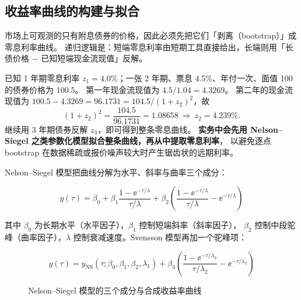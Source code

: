 \subsection{收益率曲线的构建与拟合}

市场上可观测的只有附息债券的价格，因此必须先把它们「剥离（bootstrap）」成零息利率曲线。
递归逻辑是：短端零息利率由短期工具直接给出，长端则用「长债价格 − 已知短端现金流现值」反解。

\begin{example}[两步 bootstrap]\label{ex:05-bootstrap}
已知 1 年期零息利率 $z_1 = 4.0\%$；一张 2 年期、票息 4.5\%、年付一次、面值 100 的债券价格为 100.5。
第一年现金流现值为 $4.5/1.04 = 4.3269$。
第二年的现金流现值为 $100.5 - 4.3269 = 96.1731 = 104.5/(1+z_2)^2$，故
\[
  (1+z_2)^2 = \frac{104.5}{96.1731} = 1.08658 \ \Longrightarrow\ z_2 = 4.239\%.
\]
继续用 3 年期债券反解 $z_3$，即可得到整条零息曲线。
\textbf{实务中会先用 Nelson--Siegel 之类参数化模型拟合整条曲线，再从中提取零息利率}，
以避免逐点 bootstrap 在数据稀疏或报价噪声较大时产生锯齿状的远期利率。
\end{example}

Nelson--Siegel 模型把曲线分解为水平、斜率与曲率三个成分：

\begin{equation}
  y(\tau) = \beta_0 + \beta_1\frac{1-\ee^{-\tau/\lambda}}{\tau/\lambda}
          + \beta_2\left(\frac{1-\ee^{-\tau/\lambda}}{\tau/\lambda}-\ee^{-\tau/\lambda}\right)
  \label{eq:05-ns}
\end{equation}

其中 $\beta_0$ 为长期水平（水平因子），$\beta_1$ 控制短端斜率（斜率因子），
$\beta_2$ 控制中段驼峰（曲率因子），$\lambda$ 控制衰减速度。Svensson 模型再加一个驼峰项：

\begin{equation}
  y(\tau) = y_{\text{NS}}(\tau;\beta_0,\beta_1,\beta_2,\lambda_1)
          + \beta_3\left(\frac{1-\ee^{-\tau/\lambda_2}}{\tau/\lambda_2}-\ee^{-\tau/\lambda_2}\right)
  \label{eq:05-svensson}
\end{equation}

\begin{figure}[htbp]
\centering
{}
\caption{Nelson--Siegel 模型的三个成分与合成收益率曲线}\label{fig:05-ns}
\end{figure}


